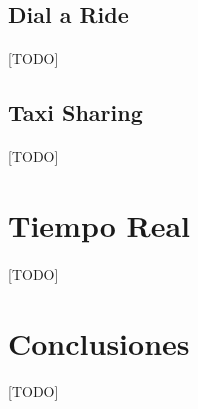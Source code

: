 \documentclass{subfiles}
\begin{document}
      \subsection{Dial a Ride}
      \label{sec:formulation_dial_a_ride}

        \paragraph{}
        [TODO]

      \subsection{Taxi Sharing}
      \label{sec:formulation_taxi_sharing}

        \paragraph{}
        [TODO]

    \section{Tiempo Real}
    \label{sec:formulation_real_time}

      \paragraph{}
      [TODO]

    \section{Conclusiones}
    \label{sec:formulation_conclusions}

      \paragraph{}
      [TODO]
\end{document}
